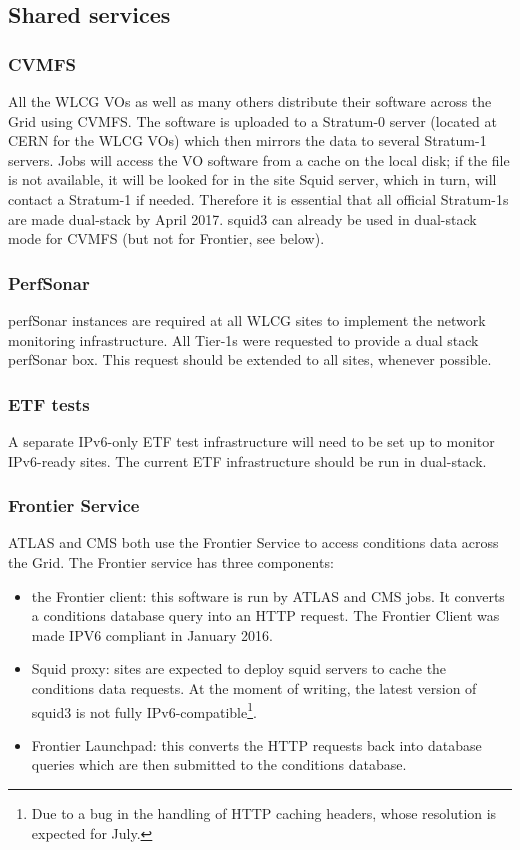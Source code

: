 \documentclass[11pt]{article}
\begin{document}

\subsection{Shared services}
\subsubsection{CVMFS}
All the WLCG VOs as well as many others distribute their software
across the Grid using CVMFS. The software is uploaded to a Stratum-0
server (located at CERN for the WLCG VOs) which then mirrors the data
to several Stratum-1 servers.  Jobs will access the VO software from a
cache on the local disk; if the file is not available, it will be
looked for in the site Squid server, which in turn, will contact a
Stratum-1 if needed.  Therefore it is essential that all official
Stratum-1s \cite{Stratum1} are made dual-stack by April 2017. squid3
can already be used in dual-stack mode for CVMFS (but not for
Frontier, see below).

\subsubsection{PerfSonar}
perfSonar instances are required at all WLCG sites to implement the
network monitoring infrastructure. All Tier-1s were requested to
provide a dual stack perfSonar box. This request should be extended
to all sites, whenever possible.

\subsubsection{ETF tests}
A separate IPv6-only ETF test infrastructure will need to be set up to
monitor IPv6-ready sites. The current ETF infrastructure should be run
in dual-stack.

\subsubsection{Frontier Service}
ATLAS and CMS both use the Frontier Service\cite{Frontier} to access
conditions data across the Grid. The Frontier service has three
components:
\begin{itemize}
\item the Frontier client: this software is run by ATLAS and CMS
  jobs. It converts a conditions database query into an HTTP request.
  The Frontier Client was made IPV6 compliant in January 2016.
\item Squid proxy: sites are expected to deploy squid servers to cache
  the conditions data requests. At the moment of writing, the latest
  version of squid3 is not fully IPv6-compatible\footnote{Due to a bug
    in the handling of HTTP caching headers, whose resolution is
    expected for July.}.
\item Frontier Launchpad: this converts the HTTP requests back into
  database queries which are then submitted to the conditions
  database.
\end{itemize}
\end{document}
